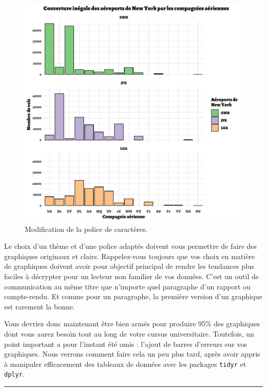 \documentclass[
  a4paper,
]{article}
\begin{document}
\begin{figure}[htpb]

{\centering \includegraphics[width=0.9\linewidth]{figure/themefont-1} 

}

\caption{Modification de la police de caractères.}\label{fig:themefont}
\end{figure}

Le choix d'un thème et d'une police adaptés doivent vous permettre de faire des graphiques originaux et clairs. Rappelez-vous toujours que vos choix en matière de graphiques doivent avoir pour objectif principal de rendre les tendances plus faciles à décrypter pour un lecteur non familier de vos données. C'est un outil de communication au même titre que n'importe quel paragraphe d'un rapport ou compte-rendu. Et comme pour un paragraphe, la première version d'un graphique est rarement la bonne.

Vous devriez donc maintenant être bien armés pour produire 95\% des graphiques dont vous aurez besoin tout au long de votre cursus universitaire. Toutefois, un point important a pour l'instant été omis : l'ajout de barres d'erreurs sur vos graphiques. Nous verrons comment faire cela un peu plus tard, après avoir appris à manipuler efficacement des tableaux de données avec les packages \texttt{tidyr} et \texttt{dplyr}.

\begin{center}\rule{0.5\linewidth}{0.5pt}\end{center}
\end{document}
